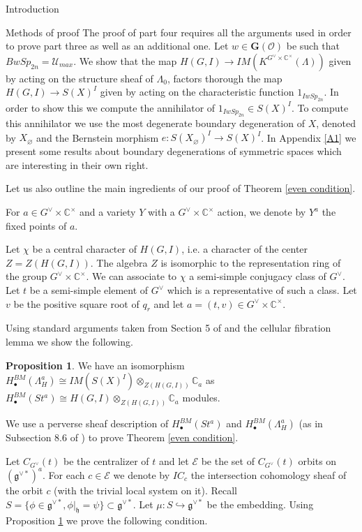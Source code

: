 \documentclass[12pt]{article}
\newcommand{\C}{\mathbb{C}}
\newcommand{\s}{\mathcal{O}}
\newcommand{\<}{\langle}
\renewcommand{\>}{\rangle}
\renewcommand{\emptyset}{\varnothing}
\theoremstyle{plain}
\theoremstyle{definition}
\newtheorem{prop}[theorem]{Proposition}
\begin{document}
\begin{section}{Introduction}
\begin{subsection}{Methods of proof}
 The proof of part four requires all the arguments used in order to prove part three as well as an additional one. Let $w\in\mathbf{G}(\s)$ be such that $BwSp_{2n}=\mathcal{U}_{max}$. We show that the map $H(G,I)\rightarrow IM(K^{G^\vee\times \C^\times}(\Lambda))$ given by acting on the structure sheaf of $\Lambda_0$, factors thorough the map $H(G,I)\rightarrow S(X)^I$ given by acting on the characteristic function $1_{IwSp_{2n}}$. In order to show this we compute the annihilator of $1_{IwSp_{2n}}\in S(X)^I$. To compute this annihilator we use the most degenerate boundary degeneration of $X$, denoted by $X_\emptyset$ and the Bernstein morphism $e:S(X_\emptyset)^I\rightarrow S(X)^I$. In Appendix \ref{A1} we present some results about boundary degenerations of symmetric spaces which are interesting in their own right.

 Let us also outline the main ingredients of our proof of Theorem \ref{even condition}.


 For $a\in G^\vee\times\C^\times$ and a variety $Y$ with a $G^\vee\times\C^\times$ action, we denote by $Y^a$ the fixed points of $a$.

 Let $\chi$ be a central character of $H(G,I)$, i.e. a character of the center $Z=Z(H(G,I))$.
The algebra $Z$ is isomorphic to the representation ring of the group $G^\vee\times\C^\times$. We can associate to $\chi$ a semi-simple conjugacy class of $G^\vee$. Let $t$ be a semi-simple element of $G^\vee$ which is a representative of such a class. Let $v$ be the positive square root of $q_r$ and let $a=(t,v)\in G^\vee\times\C^\times$.

Using standard arguments taken from Section 5 of \cite{Chriss1997RepresentationTA} and the cellular fibration lemma we show the following.

\begin{prop}\label{1.16}
 We have an isomorphism $H^{BM}_\bullet(\Lambda_H^a)\cong IM(S(X)^I)\otimes_{Z(H(G,I))} \C_a$ as $H^{BM}_\bullet(St^a)\cong H(G,I)\otimes_{Z(H(G,I))} \C_a$ modules.
\end{prop}

 
We use a perverse sheaf description of $H^{BM}_\bullet(St^a)$ and $H^{BM}_\bullet(\Lambda_H^a)$ (as in Subsection 8.6 of \cite{Chriss1997RepresentationTA}) to prove Theorem \ref{even condition}.

Let $C_{G^\vee}(t)$ be the centralizer of $t$ and let $\mathcal{E}$ be the set of $C_{G^\vee}(t)$ orbits on $(\mathfrak{g}^{\vee *})^a$. For each $c\in\mathcal{E}$ we denote by $IC_{c}$ the intersection cohomology sheaf of the orbit $c$ (with the trivial local system on it). Recall $S=\{\phi\in \mathfrak{g}^{\vee*},\phi|_\mathfrak{h}=\psi\}\subset \mathfrak{g}^{\vee*}$. Let $\mu:S\hookrightarrow \mathfrak{g}^{\vee*}$ be the embedding. Using Proposition \ref{1.16} we prove the following condition.


\end{subsection}
\end{section}
\end{document}
